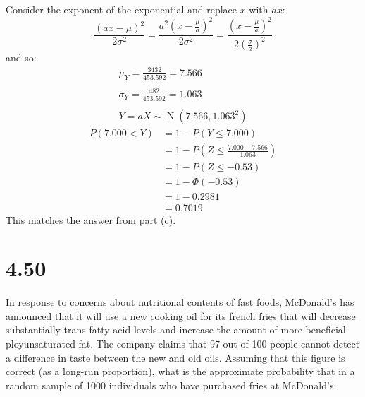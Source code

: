 \documentclass[letterpaper,12pt,fleqn]{article}
\renewcommand{\o}{\sigma}
\renewcommand{\O}{\Phi}
\newcommand{\m}{\mu}
\DeclareMathOperator{\nord}{N}
\begin{document}
\begin{enumerate}[label={\alph*)}]
  Consider the exponent of the exponential and replace \(x\) with \(ax\):
  \[\frac{(ax-\m)^2}{2\o^2}=\frac{a^2\left(x-\frac{\m}{a}\right)^2}{2\o^2}=\frac{\left(x-\frac{\m}{a}\right)^2}{
    2\left(\frac{\o}{a}\right)^2}\]
  and so:
  \begin{gather*}
    \m_Y=\frac{3432}{453.592}=7.566 \\
    \\
    \o_Y=\frac{482}{453.592}=1.063 \\
    \\
    Y=aX\sim\nord(7.566,1.063^2)
  \end{gather*}
  \begin{align*}
    P(7.000<Y) &= 1-P(Y\le7.000) \\
    &= 1-P\left(Z\le\frac{7.000-7.566}{1.063}\right) \\
    &= 1-P(Z\le-0.53) \\
    &= 1-\O(-0.53) \\
    &= 1-0.2981 \\
    &= 0.7019
  \end{align*}
  This matches the answer from part (c).
\end{enumerate}

\section*{4.50}

In response to concerns about nutritional contents of fast foods, McDonald's has announced that it will use a new cooking oil
for its french fries that will decrease substantially trans fatty acid levels and increase the amount of more beneficial
ployunsaturated fat.  The company claims that 97 out of 100 people cannot detect a difference in taste between the new and old
oils.  Assuming that this figure is correct (as a long-run proportion), what is the approximate probability that in a random
sample of 1000 individuals who have purchased fries at McDonald's:
\end{document}

